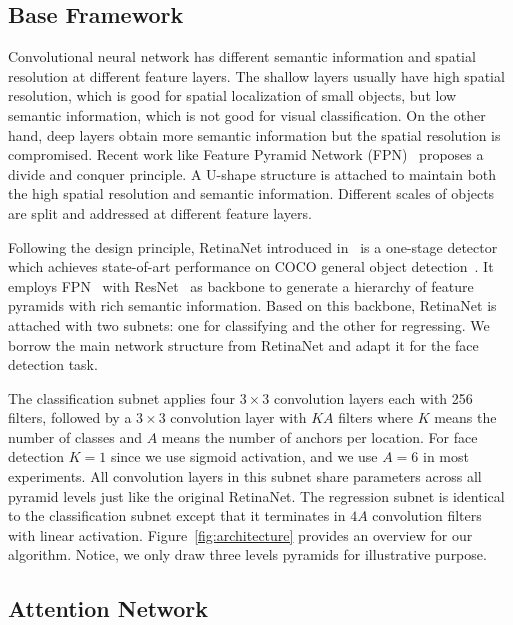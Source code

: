 \documentclass[10pt,twocolumn,letterpaper]{article}
\begin{document}
\subsection{Base Framework\label{sec:base setting}}

Convolutional neural network has different semantic information and spatial resolution at different feature layers. The shallow layers usually have high spatial resolution, which is good for spatial localization of small objects, but low semantic information, which is not good for visual classification. On the other hand, deep layers obtain more semantic information but the spatial resolution is compromised. Recent work like Feature Pyramid Network (FPN)~\cite{lin2016feature} proposes a divide and conquer principle. A U-shape structure is attached to maintain both the high spatial resolution and semantic information. Different scales of objects are split and addressed at different feature layers.

Following the design principle, RetinaNet introduced in~\cite{lin2017focal} is a one-stage detector which achieves state-of-art performance on COCO general object detection~\cite{lin2014microsoft}. It employs FPN~\cite{lin2016feature} with ResNet~\cite{He2015} as backbone to generate a hierarchy of feature pyramids with rich semantic information. Based on this backbone, RetinaNet is attached with two subnets: one for classifying and the other for regressing. We borrow the main network structure from RetinaNet and adapt it for the face detection task.
 
The classification subnet applies four $ 3\times3 $ convolution layers each with 256 filters, followed by a $ 3\times3 $ convolution layer with $ K A $ filters where $ K $ means the number of classes and $ A $ means the number of anchors per location. For face detection $ K=1 $ since we use sigmoid activation, and we use $ A=6 $ in most experiments. All convolution layers in this subnet share parameters across all pyramid levels just like the original RetinaNet. The regression subnet is identical to the classification subnet except that it terminates in $ 4A $ convolution filters with linear activation. Figure~\ref{fig:architecture} provides an overview for our algorithm. Notice, we only draw three levels pyramids for illustrative purpose.


\subsection{Attention Network}\label{sec:attention network}
\end{document}
